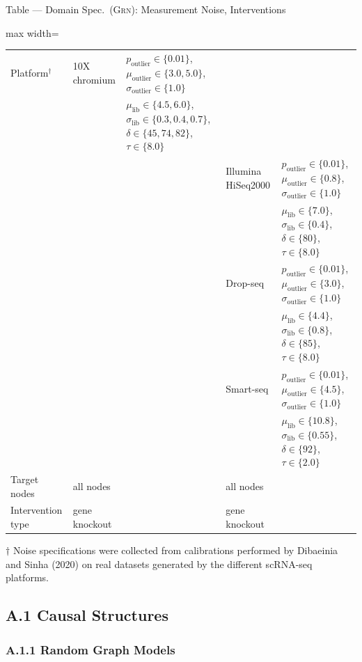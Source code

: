 \documentclass[aspectratio=169,10pt]{beamer}
\newcommand{\domain}[1]{\textsc{#1}}
\newcommand{\grndomain}{\domain{Grn}\xspace}
\newcommand{\scrna}{{scRNA-seq}\xspace}
\begin{document}
\begin{frame}{Table --- Domain Spec.\ (\grndomain): Measurement Noise, Interventions}
\tiny
\begin{adjustbox}{max width=\textwidth}
\begin{tabular}{lllll}
\toprule
Platform$^{\dagger}$ & 10X chromium &$p_{\text{outlier}} \in \{0.01\}$, $\mu_{\text{outlier}} \in \{3.0, 5.0\}$, $\sigma_{\text{outlier}} \in \{1.0\}$&&\\
&&$\mu_{\text{lib}} \in \{4.5, 6.0\}$, $\sigma_{\text{lib}} \in \{0.3, 0.4, 0.7 \}$, $\delta \in \{ 45, 74, 82\}$, $\tau \in \{8.0\}$&&\\
\midrule
&&&Illumina HiSeq2000&$p_{\text{outlier}} \in \{ 0.01 \}$, $\mu_{\text{outlier}} \in \{ 0.8\}$, $\sigma_{\text{outlier}} \in \{1.0 \}$\\
&&&&$\mu_{\text{lib}} \in \{ 7.0\}$, $\sigma_{\text{lib}} \in \{0.4\}$, $\delta \in \{ 80\}$, $\tau \in \{8.0 \}$\\
\midrule
&&&Drop-seq&$p_{\text{outlier}} \in \{ 0.01\}$, $\mu_{\text{outlier}} \in \{3.0 \}$, $\sigma_{\text{outlier}} \in \{1.0 \}$\\
&&&&$\mu_{\text{lib}} \in \{ 4.4\}$, $\sigma_{\text{lib}} \in \{0.8\}$, $\delta \in \{ 85\}$, $\tau \in \{8.0 \}$\\
\midrule
&&&Smart-seq& $p_{\text{outlier}} \in \{0.01 \}$, $\mu_{\text{outlier}} \in \{ 4.5\}$, $\sigma_{\text{outlier}} \in \{ 1.0\}$\\
&&&&$\mu_{\text{lib}} \in \{10.8 \}$, $\sigma_{\text{lib}} \in \{0.55\}$, $\delta \in \{92 \}$, $\tau \in \{2.0 \}$\\
\midrule
Target nodes & all nodes &&  all nodes &\\
Intervention type & gene knockout & & gene knockout & \\
\bottomrule
\end{tabular}
\end{adjustbox}

\vspace{0.2cm}
{\footnotesize $\dagger$ Noise specifications were collected from calibrations performed by Dibaeinia and Sinha (2020) on real datasets generated by the different \scrna platforms.}
\end{frame}

\subsection{A.1 Causal Structures}
\subsubsection{A.1.1 Random Graph Models}
\end{document}
